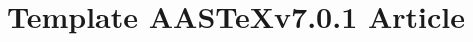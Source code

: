 \documentclass[linenumbers,trackchanges]{aastex701}
\newcommand\aastex{AAS\TeX}
\begin{document}
\title{Template \aastex v7.0.1 Article}

\end{document}

